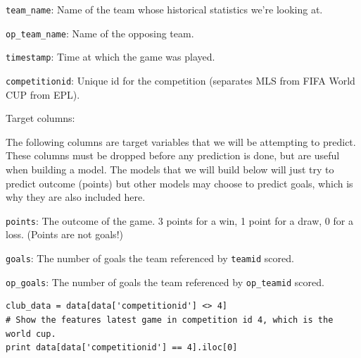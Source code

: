 \documentclass[12pt,fleqn]{article}\usepackage{common}
\begin{document}
\verb!team_name!: Name of the team whose historical statistics we're looking at.

\verb!op_team_name!: Name of the opposing team.

\verb!timestamp!: Time at which the game was played.

\verb!competitionid!: Unique id for the competition (separates MLS from FIFA World CUP from EPL).

Target columns:

The following columns are target variables that we will be attempting to
predict. These columns must be dropped before any prediction is done, but
are useful when building a model. The models that we will build below will
just try to predict outcome (points) but other models may choose to predict
goals, which is why they are also included here.

\verb!points!: The outcome of the game. 3 points for a win, 1 point for a draw, 0
for a loss. (Points are not goals!)

\verb!goals!: The number of goals the team referenced by \verb!teamid! scored.

\verb!op_goals!: The number of goals the team referenced by
\verb!op_teamid! scored.

\begin{verbatim}
club_data = data[data['competitionid'] <> 4]
# Show the features latest game in competition id 4, which is the world cup.
print data[data['competitionid'] == 4].iloc[0]
\end{verbatim}
\end{document}
